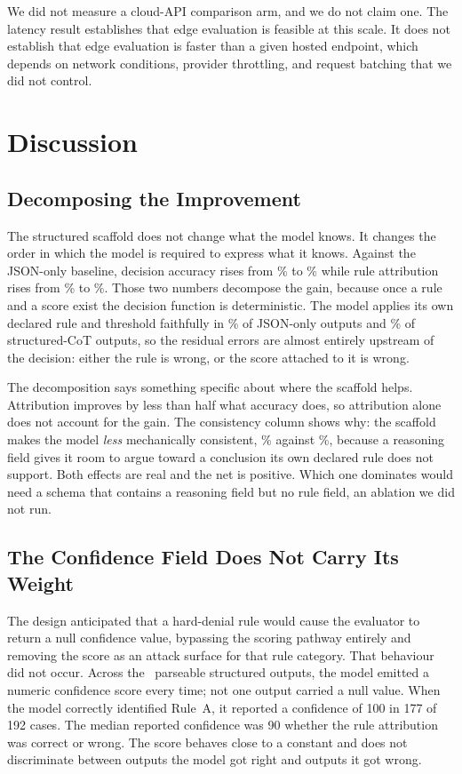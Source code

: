 \documentclass[journal,onecolumn,12pt]{IEEEtran}
\begin{document}
We did not measure a cloud-API comparison arm, and we do not claim one. The latency result establishes that edge evaluation is feasible at this scale. It does not establish that edge evaluation is faster than a given hosted endpoint, which depends on network conditions, provider throttling, and request batching that we did not control.

\section{Discussion}

\subsection{Decomposing the Improvement}
The structured scaffold does not change what the model knows. It changes the order in which the model is required to express what it knows. Against the JSON-only baseline, decision accuracy rises from \AccZero\% to \AccCot\% while rule attribution rises from \RuleAttrZero\% to \RuleAttrCot\%. Those two numbers decompose the gain, because once a rule and a score exist the decision function is deterministic. The model applies its own declared rule and threshold faithfully in \ConsistZero\% of JSON-only outputs and \ConsistCot\% of structured-CoT outputs, so the residual errors are almost entirely upstream of the decision: either the rule is wrong, or the score attached to it is wrong.

The decomposition says something specific about where the scaffold helps. Attribution improves by less than half what accuracy does, so attribution alone does not account for the gain. The consistency column shows why: the scaffold makes the model \emph{less} mechanically consistent, \ConsistCot\% against \ConsistZero\%, because a reasoning field gives it room to argue toward a conclusion its own declared rule does not support. Both effects are real and the net is positive. Which one dominates would need a schema that contains a reasoning field but no rule field, an ablation we did not run.

\subsection{The Confidence Field Does Not Carry Its Weight}
The design anticipated that a hard-denial rule would cause the evaluator to return a null confidence value, bypassing the scoring pathway entirely and removing the score as an attack surface for that rule category. That behaviour did not occur. Across the \ParsedCot\ parseable structured outputs, the model emitted a numeric confidence score every time; not one output carried a null value. When the model correctly identified Rule~A, it reported a confidence of 100 in 177 of 192 cases. The median reported confidence was 90 whether the rule attribution was correct or wrong. The score behaves close to a constant and does not discriminate between outputs the model got right and outputs it got wrong.
\end{document}
